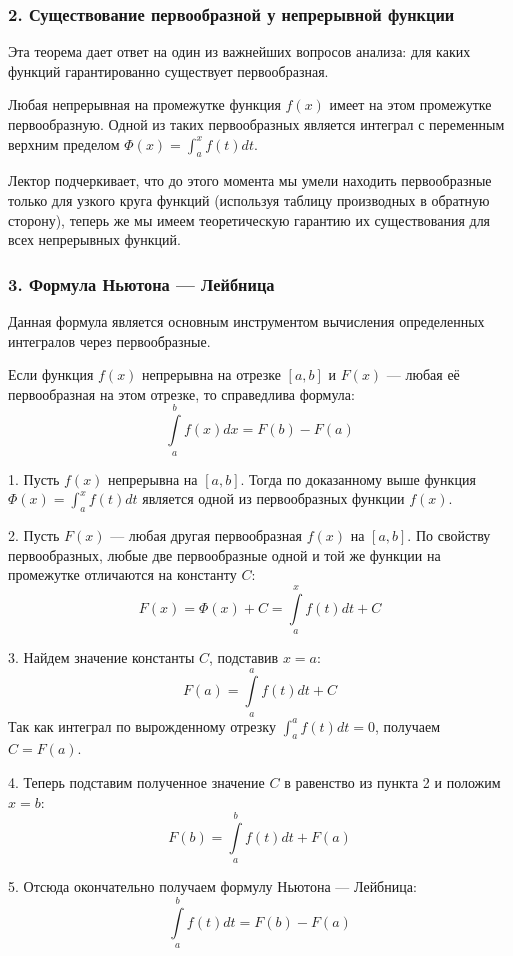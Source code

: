 \subsubsection*{2. Существование первообразной у непрерывной функции}

Эта теорема дает ответ на один из важнейших вопросов анализа: для каких функций гарантированно существует первообразная.

\begin{consequence}
Любая непрерывная на промежутке функция $f(x)$ имеет на этом промежутке первообразную. Одной из таких первообразных является интеграл с переменным верхним пределом $\Phi(x) = \int_a^x f(t) dt$.
\end{consequence}

Лектор подчеркивает, что до этого момента мы умели находить первообразные только для узкого круга функций (используя таблицу производных в обратную сторону), теперь же мы имеем теоретическую гарантию их существования для всех непрерывных функций.

\subsubsection*{3. Формула Ньютона — Лейбница}

Данная формула является основным инструментом вычисления определенных интегралов через первообразные.

\begin{theorem}
Если функция $f(x)$ непрерывна на отрезке $[a, b]$ и $F(x)$ — любая её первообразная на этом отрезке, то справедлива формула:
\[ \int\limits_a^b f(x) dx = F(b) - F(a) \]
\end{theorem}

\begin{tcolorbox}[title=Доказательство, breakable]
1. Пусть $f(x)$ непрерывна на $[a, b]$. Тогда по доказанному выше функция $\Phi(x) = \int_a^x f(t) dt$ является одной из первообразных функции $f(x)$.

2. Пусть $F(x)$ — любая другая первообразная $f(x)$ на $[a, b]$. По свойству первообразных, любые две первообразные одной и той же функции на промежутке отличаются на константу $C$:
\[ F(x) = \Phi(x) + C = \int\limits_a^x f(t) dt + C \]

3. Найдем значение константы $C$, подставив $x = a$:
\[ F(a) = \int\limits_a^a f(t) dt + C \]
Так как интеграл по вырожденному отрезку $\int_a^a f(t) dt = 0$, получаем $C = F(a)$.

4. Теперь подставим полученное значение $C$ в равенство из пункта 2 и положим $x = b$:
\[ F(b) = \int\limits_a^b f(t) dt + F(a) \]

5. Отсюда окончательно получаем формулу Ньютона — Лейбница:
\[ \int\limits_a^b f(t) dt = F(b) - F(a) \]
\end{tcolorbox}

